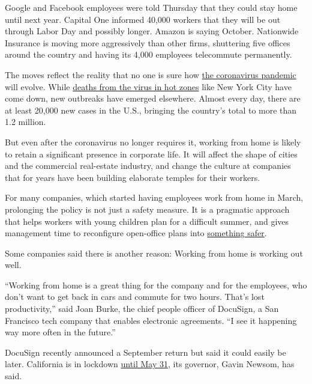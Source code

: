Google and Facebook employees were told Thursday that they could stay
home until next year. Capital One informed 40,000 workers that they will
be out through Labor Day and possibly longer. Amazon is saying October.
Nationwide Insurance is moving more aggressively than other firms,
shuttering five offices around the country and having its 4,000
employees telecommute permanently.

The moves reflect the reality that no one is sure how
\href{https://www.nytimes3xbfgragh.onion/news-event/coronavirus?action=click\&pgtype=Article\&state=default\&module=STYLN_coronahub\&variant=show\&region=header\&context=menu}{the
coronavirus pandemic} will evolve. While
\href{https://www.nytimes3xbfgragh.onion/2020/05/05/us/coronavirus-deaths-cases-united-states.html}{deaths
from the virus in hot zones} like New York City have come down, new
outbreaks have emerged elsewhere. Almost every day, there are at least
20,000 new cases in the U.S., bringing the country's total to more than
1.2 million.

But even after the coronavirus no longer requires it, working from home
is likely to retain a significant presence in corporate life. It will
affect the shape of cities and the commercial real-estate industry, and
change the culture at companies that for years have been building
elaborate temples for their workers.

For many companies, which started having employees work from home in
March, prolonging the policy is not just a safety measure. It is a
pragmatic approach that helps workers with young children plan for a
difficult summer, and gives management time to reconfigure open-office
plans into
\href{https://www.nytimes3xbfgragh.onion/2020/05/04/health/coronavirus-office-makeover.html}{something
safer}.

Some companies said there is another reason: Working from home is
working out well.

``Working from home is a great thing for the company and for the
employees, who don't want to get back in cars and commute for two hours.
That's lost productivity,'' said Joan Burke, the chief people officer of
DocuSign, a San Francisco tech company that enables electronic
agreements. ``I see it happening way more often in the future.''

DocuSign recently announced a September return but said it could easily
be later. California is in lockdown
\href{https://www.mercurynews.com/2020/04/27/bay-areas-shelter-in-place-to-last-through-may/}{until
May 31}, its governor, Gavin Newsom, has said.

